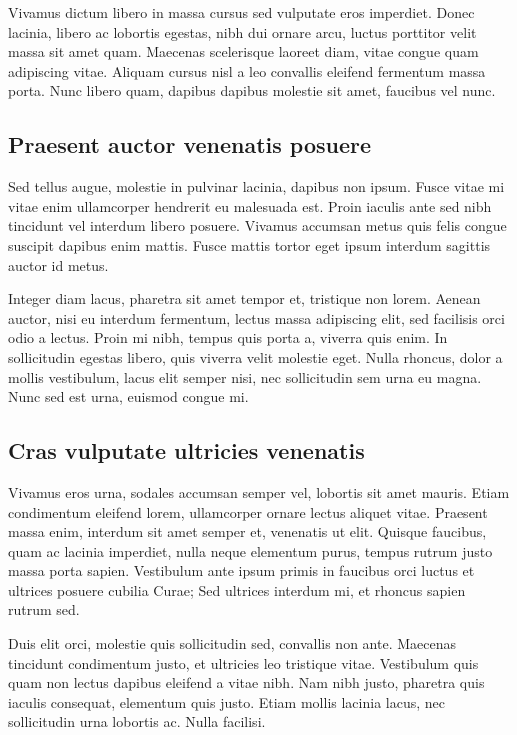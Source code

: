 Vivamus dictum libero in massa cursus sed vulputate eros imperdiet. Donec
lacinia, libero ac lobortis egestas, nibh dui ornare arcu, luctus porttitor
velit massa sit amet quam. Maecenas scelerisque laoreet diam, vitae congue
quam adipiscing vitae. Aliquam cursus nisl a leo convallis eleifend
fermentum massa porta. Nunc libero quam, dapibus dapibus molestie sit amet,
faucibus vel nunc.

\subsection{Praesent auctor venenatis posuere}
Sed tellus augue, molestie in pulvinar lacinia, dapibus non ipsum. Fusce
vitae mi vitae enim ullamcorper hendrerit eu malesuada est. Proin iaculis
ante sed nibh tincidunt vel interdum libero posuere. Vivamus accumsan metus
quis felis congue suscipit dapibus enim mattis. Fusce mattis tortor eget
ipsum interdum sagittis auctor id metus.

Integer diam lacus, pharetra sit amet tempor et, tristique non lorem.
Aenean auctor, nisi eu interdum fermentum, lectus massa adipiscing elit,
sed facilisis orci odio a lectus. Proin mi nibh, tempus quis porta a,
viverra quis enim. In sollicitudin egestas libero, quis viverra velit
molestie eget. Nulla rhoncus, dolor a mollis vestibulum, lacus elit semper
nisi, nec sollicitudin sem urna eu magna. Nunc sed est urna, euismod congue
mi.

\subsection{Cras vulputate ultricies venenatis}
Vivamus eros urna, sodales accumsan semper vel, lobortis sit amet mauris.
Etiam condimentum eleifend lorem, ullamcorper ornare lectus aliquet vitae.
Praesent massa enim, interdum sit amet semper et, venenatis ut elit.
Quisque faucibus, quam ac lacinia imperdiet, nulla neque elementum purus,
tempus rutrum justo massa porta sapien. Vestibulum ante ipsum primis in
faucibus orci luctus et ultrices posuere cubilia Curae; Sed ultrices
interdum mi, et rhoncus sapien rutrum sed.

Duis elit orci, molestie quis sollicitudin sed, convallis non ante.
Maecenas tincidunt condimentum justo, et ultricies leo tristique vitae.
Vestibulum quis quam non lectus dapibus eleifend a vitae nibh. Nam nibh
justo, pharetra quis iaculis consequat, elementum quis justo. Etiam mollis
lacinia lacus, nec sollicitudin urna lobortis ac. Nulla facilisi.

